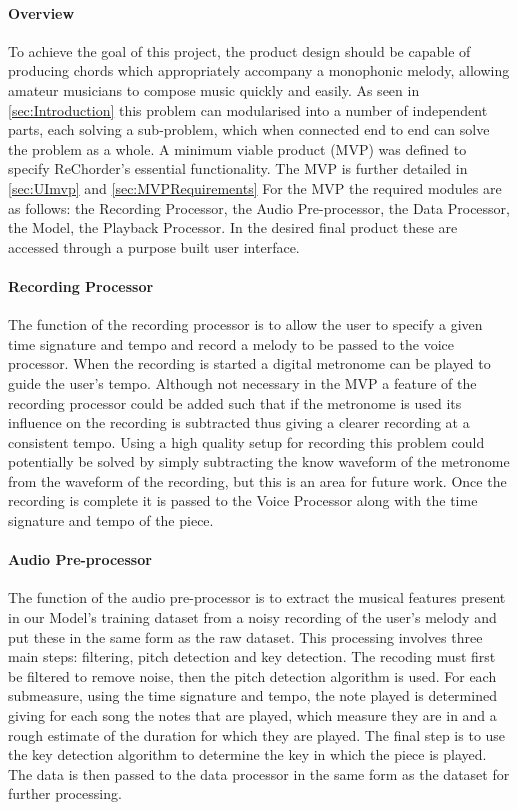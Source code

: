 \paragraph{Overview}
To achieve the goal of this project, the product design should be capable of producing chords which appropriately accompany a monophonic melody, allowing amateur musicians to compose music quickly and easily.
As seen in \cref{sec:Introduction} this problem can modularised into a number of independent parts, each solving a sub-problem, which when connected end to end can solve the problem as a whole.
A minimum viable product (MVP) was defined to specify ReChorder's essential functionality.
The MVP is further detailed in \cref{sec:UImvp} and \cref{sec:MVPRequirements}
For the MVP the required modules are as follows: the Recording Processor, the Audio Pre-processor, the Data Processor, the Model, the Playback Processor.
In the desired final product these are accessed through a purpose built user interface.

\paragraph{Recording Processor}

The function of the recording processor is to allow the user to specify a given time signature and tempo and record a melody to be passed to the voice processor.
When the recording is started a digital metronome can be played to guide the user's tempo. 
Although not necessary in the MVP a feature of the recording processor could be added such that if the metronome is used its influence on the recording is subtracted thus giving a clearer recording at a consistent tempo.
Using a high quality setup for recording this problem could potentially be solved by simply subtracting the know waveform of the metronome from the waveform of the recording, but this is an area for future work.
Once the recording is complete it is passed to the Voice Processor along with the time signature and tempo of the piece.

\paragraph{Audio Pre-processor}

The function of the audio pre-processor is to extract the musical features present in our Model's training dataset from a noisy recording of the user's melody and put these in the same form as the raw dataset.
This processing involves three main steps: filtering, pitch detection and key detection.
The recoding must first be filtered to remove noise, then the pitch detection algorithm is used.
For each submeasure, using the time signature and tempo, the note played is determined giving for each song the notes that are played, which measure they are in and a rough estimate of the duration for which they are played.
The final step is to use the key detection algorithm to determine the key in which the piece is played.
The data is then passed to the data processor in the same form as the dataset for further processing.

